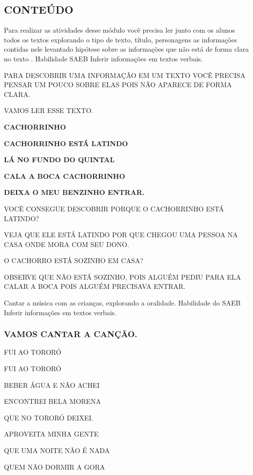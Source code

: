 \begin{escola}
\subsection{CONTEÚDO}\label{conteuxfado-5}

Para realizar as atividades desse módulo você precisa ler junto com os
alunos todos os textos explorando o tipo de texto, título, personagens
as informações contidas nele levantado hipótese sobre as informações que
não está de forma clara no texto . Habilidade SAEB Inferir informações
em textos verbais.

PARA DESCOBRIR UMA INFORMAÇÃO EM UM TEXTO VOCÊ PRECISA PENSAR UM POUCO
SOBRE ELAS POIS NÃO APARECE DE FORMA CLARA.

VAMOS LER ESSE TEXTO.

\textbf{CACHORRINHO}

\textbf{CACHORRINHO ESTÁ LATINDO}

\textbf{LÁ NO FUNDO DO QUINTAL}

\textbf{CALA A BOCA CACHORRINHO}

\textbf{DEIXA O MEU BENZINHO ENTRAR.}

VOCÊ CONSEGUE DESCOBRIR PORQUE O CACHORRINHO ESTÁ LATINDO?

VEJA QUE ELE ESTÁ LATINDO POR QUE CHEGOU UMA PESSOA NA CASA ONDE MORA
COM SEU DONO.

O CACHORRO ESTÁ SOZINHO EM CASA?

OBSERVE QUE NÃO ESTÁ SOZINHO, POIS ALGUÉM PEDIU PARA ELA CALAR A BOCA
POIS ALGUÉM PRECISAVA ENTRAR.


Cantar a música com as crianças, explorando a oralidade. Habilidade do SAEB
Inferir informações em textos verbais.

\subsubsection{VAMOS CANTAR A
CANÇÃO.}\label{vamos-cantar-a-canuxe7uxe3o.}

FUI AO TORORÓ

FUI AO TORORÓ

BEBER ÁGUA E NÃO ACHEI

ENCONTREI BELA MORENA

QUE NO TORORÓ DEIXEI.

APROVEITA MINHA GENTE

QUE UMA NOITE NÃO É NADA

QUEM NÃO DORMIR A GORA


\end{escola}
